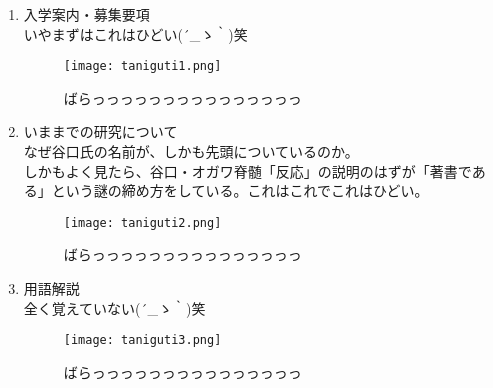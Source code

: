 \begin{enumerate}
\item 入学案内・募集要項\\
いやまずはこれはひどい\sf (´\_ゝ｀)笑\\

\begin{figure}[H]
  \centering
  \texttt{[image: taniguti1.png]}
  \caption{ばらっっっっっっっっっっっっっっっ}
\label{taniguti1}
\end{figure}

\item いままでの研究について\\
なぜ谷口氏の名前が、しかも先頭についているのか。\\
しかもよく見たら、谷口・オガワ脊髄「反応」の説明のはずが「著書である」という謎の締め方をしている。これはこれでこれはひどい。\\

\begin{figure}[H]
  \centering
  \texttt{[image: taniguti2.png]}
  \caption{ばらっっっっっっっっっっっっっっっ}
\label{taniguti2}
\end{figure}


\item 用語解説\\
全く覚えていない\sf (´\_ゝ｀)笑\\

\begin{figure}[H]
  \centering
  \texttt{[image: taniguti3.png]}
  \caption{ばらっっっっっっっっっっっっっっっ}
\label{taniguti3}
\end{figure}

\end{enumerate}

